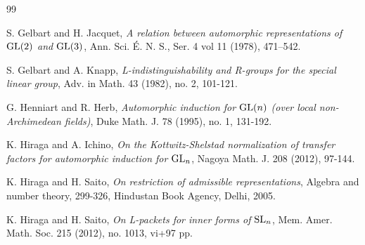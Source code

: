 \documentclass[11pt]{amsart}
\theoremstyle{plain}
\numberwithin{equation}{section}
\def\SL{{\rm SL}}
\def\GSp{{\rm GSp}}
\def\PGSp{{\rm PGSp}}
\def\GL{{\rm GL}}
\begin{document}
\begin{thebibliography}{99}
  
 
 
 

 S. Gelbart and H. Jacquet, {\em A relation between automorphic representations of ${\rm GL}(2)$ and
${\rm GL}(3)$}, Ann. Sci. \'E. N. S., Ser. 4 vol 11 (1978), 471--542.

 
  S. Gelbart and A. Knapp, {\em L-indistinguishability and R-groups for the special linear group},  Adv. in Math. 43 (1982), no. 2, 101-121.
 
 
 
  G. Henniart and R. Herb, {\em Automorphic induction for $\GL(n)$ (over local
non-Archimedean fields)},  Duke Math. J. 78 (1995), no. 1, 131-192.
 
  K. Hiraga and A. Ichino, {\em On the Kottwitz-Shelstad normalization of transfer factors for automorphic induction for $\GL_n$},  Nagoya Math. J. 208 (2012), 97-144.
 
  K. Hiraga and H. Saito, {\em On restriction of admissible representations},
Algebra and number theory, 299-326, Hindustan Book Agency, Delhi, 2005.

  K. Hiraga and H. Saito, {\em  On L-packets for inner forms of $\SL_n$},  Mem. Amer. Math. Soc. 215 (2012), no. 1013, vi+97 pp.
 

\end{thebibliography}
\end{document}
